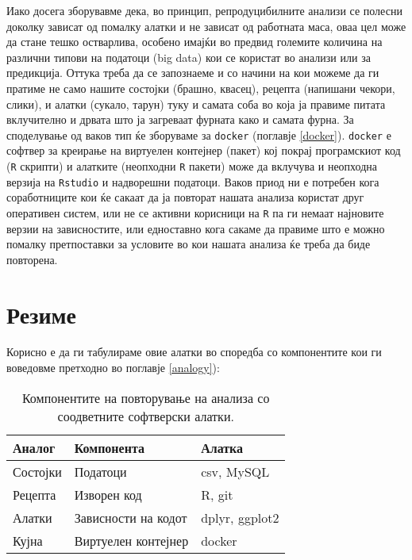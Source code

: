 \documentclass[
]{book}
\begin{document}
Иако досега зборувавме дека, во принцип, репродуцибилните анализи се полесни доколку зависат од помалку алатки и не зависат од работната маса, оваа цел може да стане тешко остварлива, особено имајќи во предвид големите количина на различни типови на податоци (big data) кои се користат во анализи или за предикција. Оттука треба да се запознаеме и со начини на кои можеме да ги пратиме не само нашите состојки (брашно, квасец), рецепта (напишани чекори, слики), и алатки (сукало, тарун) туку и самата соба во која ја правиме питата вклучително и дрвата што ја загреваат фурната како и самата фурна. За споделување од ваков тип ќе зборуваме за \texttt{docker} (поглавје \ref{docker}). \texttt{docker} е софтвер за креирање на виртуелен контејнер (пакет) кој покрај програмскиот код (\texttt{R} скрипти) и алатките (неопходни \texttt{R} пакети) може да вклучува и неопходна верзија на \texttt{Rstudio} и надворешни податоци. Ваков приод ни е потребен кога соработниците кои ќе сакаат да ја повторат нашата анализа користат друг оперативен систем, или не се активни корисници на \texttt{R} па ги немаат најновите верзии на зависностите, или едноставно кога сакаме да правиме што е можно помалку претпоставки за условите во кои нашата анализа ќе треба да биде повторена.

\hypertarget{ux440ux435ux437ux438ux43cux435}{%
\section{Резиме}\label{ux440ux435ux437ux438ux43cux435}}

Корисно е да ги табулираме овие алатки во споредба со компонентите кои ги воведовме претходно во поглавје \ref{analogy}):

\begin{table}

\caption{\label{tab:unnamed-chunk-1}Компонентите на повторување на анализа со соодветните софтверски алатки.}
\centering
\begin{tabular}[t]{l|l|l}
\hline
Аналог & Компонента & Алатка\\
\hline
Состојки & Податоци & csv, MySQL\\
\hline
Рецепта & Изворен код & R, git\\
\hline
Алатки & Зависности на кодот & dplyr, ggplot2\\
\hline
Кујна & Виртуелен контејнер & docker\\
\hline
\end{tabular}
\end{table}
\end{document}
